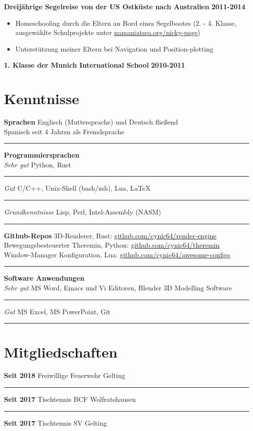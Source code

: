 \documentclass[12pt]{article}
\newcommand{\link}[1]{{\color{blue}\underline{#1}}}
\newcommand{\sect}[1]{
  {
    \vspace{12pt}
    \section*{
      \fontsize{18}{0}\selectfont
      \hspace{-12pt}
      \vspace{-12pt}
      #1
    }
    \vspace{-6pt}
  }
}
\newcommand{\sep}{{\color{gray}\vspace{-12pt}\hrule}}
\begin{document}
\textbf{Dreij{\"a}hrige Segelreise von der US Ostk{\"u}ste nach Australien} \hfill{\textbf{2011-2014}}

\vspace{-18pt}
\begin{itemize}[leftmargin=*]
  \itemsep3pt

\item Homeschooling durch die Eltern an Bord eines Segelbootes (2. - 4. Klasse,
  ausgew{\"a}hlte Schulprojekte unter \link{namaniatsea.org/nicky-page})

\item Unterst{\"u}tzung meiner Eltern bei Navigation und Position-plotting

\end{itemize}
\vspace{-6pt}

\textbf{1. Klasse der Munich International School} \hfill{\textbf{2010-2011}}

\pagebreak

\sect{Kenntnisse}
\textbf{Sprachen} \hfill{Englisch (Muttersprache) und Deutsch flie{\ss}end} \\
\hspace*{\fill}Spanisch seit 4 Jahren als Fremdsprache \\
\sep
\vspace{12pt}

\textbf{Programmiersprachen} \\
\textit{Sehr gut} \hfill{Python, Rust} \\
\sep
\textit{Gut} \hfill{C/C++, Unix-Shell (bash/zsh), Lua, \LaTeX} \\
\sep
\textit{Grundkenntnisse} \hfill{Lisp, Perl, Intel-Assembly (NASM)} \\
\sep
\vspace{12pt}

{
  \small
  \textbf{Github-Repos} \hfill{3D-Renderer, Rust: \link{github.com/cynic64/render-engine}} \\
  \hspace*{\fill} Bewegungsbesteuerter Theremin, Python: \link{github.com/cynic64/theremin} \\
  \hspace*{\fill} Window-Manager Konfiguration, Lua:
  \link{github.com/cynic64/awesome-configs} \\
}
\sep
\vspace{12pt}

\textbf{Software Anwendungen} \\
\textit{Sehr gut} \hfill{MS Word, Emacs und Vi Editoren, Blender 3D Modelling Software} \\
\sep
\textit{Gut} \hfill{MS Excel, MS PowerPoint, Git} \\
\sep
\vspace{12pt}

\sect{Mitgliedschaften}

\textbf{Seit 2018} \hfill{Freiwillige Feuerwehr Gelting} \\
\sep
\textbf{Seit 2017} \hfill{Tischtennis BCF Wolfratshausen} \\
\sep
\textbf{Seit 2017} \hfill{Tischtennis SV Gelting}
\end{document}
